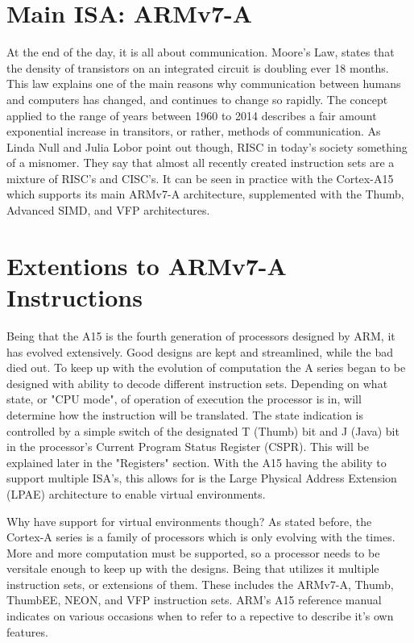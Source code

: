 \documentclass[12pt]{scrreprt}
\begin{document}
	\section{Main ISA: ARMv7-A}

	At the end of the day, it is all about communication. 
	Moore's Law, states that the density of transistors on an integrated circuit is doubling ever 18 months.
	This law explains one of the main reasons why communication between humans and computers has changed, and continues to change so rapidly.
	The concept applied to the range of years between 1960 to 2014 describes a fair amount exponential increase in transitors, or rather, methods of communication.
	As Linda Null and Julia Lobor point out though, RISC in today's society something of a misnomer.
	They say that almost all recently created instruction sets are a mixture of RISC's and CISC's.
	It can be seen in practice with the Cortex-A15 which supports its main ARMv7-A architecture, supplemented with the Thumb, Advanced SIMD, and VFP architectures.

	\section{Extentions to ARMv7-A Instructions}

	Being that the A15 is the fourth generation of processors designed by ARM, it has evolved extensively.
	Good designs are kept and streamlined, while the bad died out.
	To keep up with the evolution of computation the A series began to be designed with ability to decode different instruction sets. 
	Depending on what state, or "CPU mode", of operation of execution the processor is in, will determine how the instruction will be translated.
	The state indication is controlled by a simple switch of the designated T (Thumb) bit and J (Java) bit in the processor's Current Program Status Register (CSPR).
	This will be explained later in the "Registers" section.
	With the A15 having the ability to support multiple ISA's, this allows for is the Large Physical Address Extension (LPAE) architecture to enable virtual environments.

	Why have support for virtual environments though? As stated before, the Cortex-A series is a family of processors which is only evolving with the times.
	More and more computation must be supported, so a processor needs to be versitale enough to keep up with the designs.
	Being that utilizes it multiple instruction sets, or extensions of them. These includes the ARMv7-A, Thumb, ThumbEE, NEON, and VFP instruction sets. 
	ARM's A15 reference manual indicates on various occasions when to refer to a repective to describe it's own features.
\end{document}
